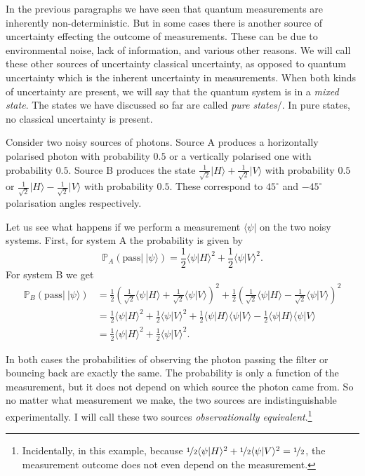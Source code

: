In the previous paragraphs we have seen that quantum measurements are inherently non-deterministic. But in some cases there is another source of uncertainty effecting the outcome of measurements. These can be due to environmental noise, lack of information, and various other reasons. We will call these other sources of uncertainty classical uncertainty, as opposed to quantum uncertainty which is the inherent uncertainty in measurements. When both kinds of uncertainty are present, we will say that the quantum system is in a \emph{mixed state}. The states we have discussed so far are called \emph{pure states}/. In pure states, no classical uncertainty is present.

\begin{example}
Consider two noisy sources of photons. Source A produces a horizontally polarised photon with probability $0.5$ or a vertically polarised one with probability $0.5$. Source B produces the state $\frac{1}{\sqrt{2}}\vert H \rangle + \frac{1}{\sqrt{2}} \vert V \rangle$ with probability $0.5$ or $\frac{1}{\sqrt{2}}\vert H \rangle - \frac{1}{\sqrt{2}} \vert V \rangle$ with probability $0.5$. These correspond to $45^{\circ}$ and $-45^{\circ}$ polarisation angles respectively.

Let us see what happens if we perform a measurement $\langle \psi \vert$ on the two noisy systems. First, for system A the probability is given by
%
\begin{equation}
\mathbb{P}_{A}\left( \mbox{pass} \vert\ \vert\psi\rangle \right) = \frac{1}{2} \langle\psi\vert H\rangle^2 + \frac{1}{2} \langle\psi\vert V\rangle^2.
\end{equation}
%
For system B we get
%
\begin{align}
\mathbb{P}_{B}\left( \mbox{pass} \vert\ \vert\psi\rangle \right) &= \frac{1}{2} \left(\frac{1}{\sqrt{2}}\langle\psi\vert H\rangle + \frac{1}{\sqrt{2}}\langle\psi\vert V \rangle\right)^2 + \frac{1}{2} \left(\frac{1}{\sqrt{2}}\langle\psi\vert H\rangle - \frac{1}{\sqrt{2}}\langle\psi\vert V \rangle\right)^2 \\
	&= \frac{1}{2} \langle\psi\vert H\rangle^2 + \frac{1}{2} \langle\psi\vert V\rangle^2 + \frac{1}{2}\langle\psi\vert H\rangle\langle\psi\vert V\rangle - \frac{1}{2}\langle\psi\vert H\rangle\langle\psi\vert V\rangle \\
	&= \frac{1}{2} \langle\psi\vert H\rangle^2 + \frac{1}{2} \langle\psi\vert V\rangle^2.
\end{align}

In both cases the probabilities of observing the photon passing the filter or bouncing back are exactly the same. The probability is only a function of the measurement, but it does not depend on which source the photon came from. So no matter what measurement we make, the two sources are indistinguishable experimentally. I will call these two sources \emph{observationally equivalent}.\footnote{Incidentally, in this example, because $\nicefrac{1}{2} \langle\psi\vert H\rangle^2 + \nicefrac{1}{2} \langle\psi\vert V\rangle^2 = \nicefrac{1}{2}$, the measurement outcome does not even depend on the measurement.}
\label{empl:two_noisy_systems}
\end{example}

